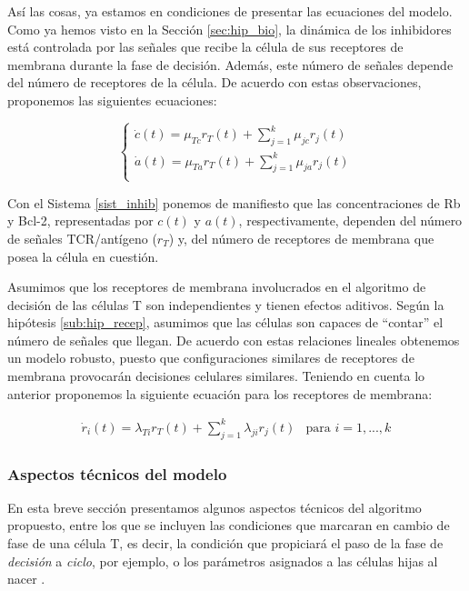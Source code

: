 Así las cosas, ya estamos en condiciones de presentar las ecuaciones del modelo. Como ya hemos visto en la Sección \ref{sec:hip_bio}, la dinámica de los inhibidores está controlada por las señales que recibe la célula de sus receptores de membrana durante la fase de decisión. Además, este número de señales depende del número de receptores de la célula. De acuerdo con estas observaciones, proponemos las siguientes ecuaciones:

\begin{equation}
	\label{sist_inhib}
	\left\{ \begin{array}{l}
	\dot{c}(t) = \mu_{Tc}r_{T}(t) + \sum_{j=1}^{k}\mu_{jc}r_{j}(t)\\
	\dot{a}(t) = \mu_{Ta}r_{T}(t) + \sum_{j=1}^{k}\mu_{ja}r_{j}(t) \\
	\end{array}
	\right.
\end{equation}

Con el Sistema \ref{sist_inhib} ponemos de manifiesto que las concentraciones de Rb y Bcl-2, representadas por $c(t)$ y $a(t)$, respectivamente, dependen del número de señales TCR/antígeno ($r_{T}$) y, del número de receptores de membrana que posea la célula en cuestión.

Asumimos que los receptores de membrana involucrados en el algoritmo de decisión de las células T son independientes y tienen efectos aditivos. Según la hipótesis \ref{sub:hip_recep}, asumimos que las células son capaces de ``contar'' el número de señales que llegan. De acuerdo con estas relaciones lineales obtenemos un modelo robusto, puesto que configuraciones similares de receptores de membrana provocarán decisiones celulares similares. Teniendo en cuenta lo anterior proponemos la siguiente ecuación para los receptores de membrana:



\begin{equation}
	\label{sist_recep}
	\begin{array}{ll}
	\dot{r}_{i}(t) = \lambda_{Ti}r_{T}(t) + \sum_{j=1}^{k}\lambda_{ji}r_{j}(t) & \mbox{para $i=1,...,k$} 
	\end{array}
\end{equation}


\subsubsection{Aspectos técnicos del modelo}

En esta breve sección presentamos algunos aspectos técnicos del algoritmo propuesto, entre los que se incluyen las condiciones que marcaran en cambio de fase de una célula T, es decir, la condición que propiciará el paso de la fase de \textit{decisión} a \textit{ciclo}, por ejemplo, o los parámetros asignados a las células hijas al nacer .

